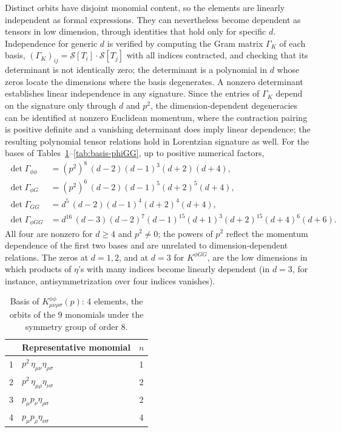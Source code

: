 \documentclass[prd,aps,preprint,superscriptaddress,nofootinbib,amsmath,amssymb,eqsecnum]{revtex4-2}
\begin{document}
Distinct orbits have disjoint monomial content, so the elements are linearly independent as
formal expressions. They can nevertheless become dependent as tensors in low dimension,
through identities that hold only for specific $d$. Independence for generic $d$ is verified by
computing the Gram matrix $\Gamma_K$ of each basis, $(\Gamma_K)_{ij}=\mathcal{S}[T_i]\cdot\mathcal{S}[T_j]$
with all indices contracted, and checking that its determinant is not identically zero; the
determinant is a polynomial in $d$ whose zeros locate the dimensions where the basis
degenerates. A nonzero determinant establishes linear independence in any signature. Since
the entries of $\Gamma_K$ depend on the signature only through $d$ and $p^2$, the
dimension-dependent degeneracies can be identified at nonzero Euclidean momentum, where the
contraction pairing is positive definite and a vanishing determinant does imply linear
dependence; the resulting polynomial tensor relations hold in Lorentzian signature as well. For the bases of Tables~\ref{tab:basis-phiphi}--\ref{tab:basis-phiGG}, up to
positive numerical factors,
\begin{align}
\det\Gamma_{\phi\phi}&=(p^2)^8\,(d-2)(d-1)^3(d+2)(d+4),\\
\det\Gamma_{\phi G}&=(p^2)^6\,(d-2)(d-1)^5(d+2)^5(d+4),\\
\det\Gamma_{GG}&=d^5\,(d-2)(d-1)^4(d+2)^4(d+4),\\
\det\Gamma_{\phi GG}&=d^{16}\,(d-3)(d-2)^7(d-1)^{15}(d+1)^3(d+2)^{15}(d+4)^6(d+6).
\end{align}
All four are nonzero for $d\geq4$ and $p^2\neq0$; the powers of $p^2$ reflect the momentum
dependence of the first two bases and are unrelated to dimension-dependent relations. The
zeros at $d=1,2$, and at $d=3$ for $K^{\phi GG}$,
are the low dimensions in which products of $\eta$'s with many indices become linearly
dependent (in $d=3$, for instance, antisymmetrization over four indices vanishes).

\begin{table}[htb]
\centering
\begin{tabular}{@{}cl c@{}}
\toprule
& Representative monomial & $n$ \\
\midrule
1 & $p^2\,\eta_{\mu\nu}\eta_{\rho\sigma}$ & 1 \\
2 & $p^2\,\eta_{\mu\rho}\eta_{\nu\sigma}$ & 2 \\
3 & $p_{\mu}p_{\nu}\eta_{\rho\sigma}$ & 2 \\
4 & $p_{\mu}p_{\rho}\eta_{\nu\sigma}$ & 4 \\
\bottomrule
\end{tabular}
\caption{Basis of $K^{\phi\phi}_{\mu\nu\rho\sigma}(p)$: 4 elements, the orbits of the 9 monomials
under the symmetry group of order 8.}
\label{tab:basis-phiphi}
\end{table}
\end{document}
